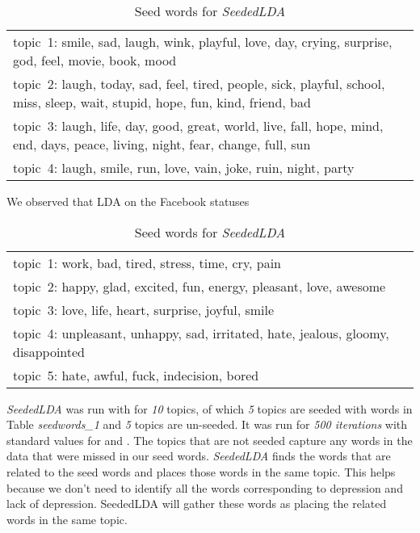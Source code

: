 \begin{table*} [ht!]
	\begin{tabular}{ l }
\hline
{topic~1: smile, sad, laugh, wink, playful, love, day, crying, surprise, god, feel, movie, book, mood}\\
{topic~2: laugh, today, sad, feel, tired, people, sick, playful, school, miss, sleep, wait, stupid, hope, fun, kind, friend, bad}\\
{topic~3: laugh, life, day, good, great, world, live, fall, hope, mind, end, days, peace, living, night, fear, change, full, sun}\\
{topic~4: laugh, smile, run, love, vain, joke, ruin, night, party}\\
\hline
    \end{tabular}
      \caption{\noindent Seed words for \textit{SeededLDA}}
        \label{table:ldawords_1}
\end{table*}

We observed that LDA on the Facebook statuses
\begin{table*} [ht!]
	\begin{tabular}{ l }
	\hline
{topic~1: work, bad, tired, stress, time, cry, pain}\\
{topic~2: happy, glad, excited, fun, energy, pleasant, love, awesome}\\
{topic~3: love, life, heart, surprise, joyful, smile}\\
{topic~4: unpleasant, unhappy, sad, irritated, hate, jealous, gloomy, disappointed }\\
{topic~5: hate, awful, fuck, indecision, bored}\\
\hline
    \end{tabular}
      \caption{\noindent Seed words for \textit{SeededLDA}}
        \label{table:seedwords_1}
\end{table*}

\textit{SeededLDA} was run with for \textit{10} topics, of which \textit{5} topics are seeded with words in Table \textit{seedwords\_1} and \textit{5} topics are un-seeded. It was run for \textit{500 iterations} with standard values for \alpha and \beta. The topics that are not seeded capture any words in the data that were missed in our seed words. \textit{SeededLDA} finds the words that are related to the seed words and places those words in the same topic. This helps because we don't need to identify all the words corresponding to depression and lack of depression. SeededLDA will gather these words as placing the related words in the same topic.


